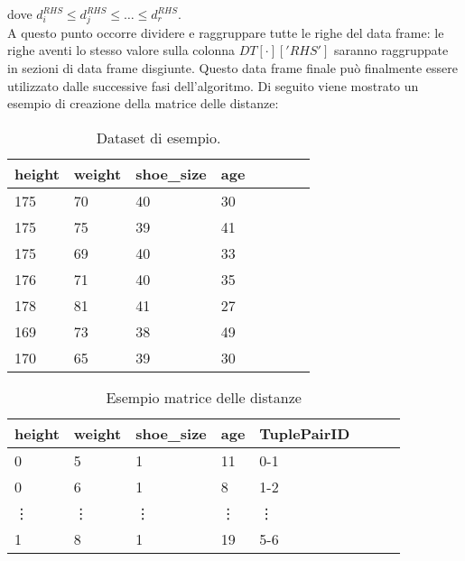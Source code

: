 dove $d^{RHS}_i \leq d^{RHS}_j \leq \ldots \leq d^{RHS}_r$. \\
A questo punto occorre dividere e raggruppare tutte le righe del data frame: le righe aventi lo stesso valore sulla colonna $DT[\cdot]['RHS']$ saranno raggruppate in sezioni di data frame disgiunte. 
Questo data frame finale può finalmente essere utilizzato dalle successive fasi dell'algoritmo.
\newpage
Di seguito viene mostrato un esempio di creazione della matrice delle distanze:\\
\begin{table}[H]
	\centering
	\begin{tabular}{l l l l l l l l}
		height & weight & shoe{\_}size & age \\
		\hline
		175 & 70 & 40 & 30\\
		175 & 75 & 39 & 41\\
		175 & 69 & 40 & 33\\
		176 & 71 & 40 & 35\\
		178 & 81 & 41 & 27\\
		169 & 73 & 38 & 49\\
		170 & 65 & 39 & 30\\
	\end{tabular}
	\caption{Dataset di esempio.}
	\label{tab:Dataset_di_esempio}
\end{table}
\begin{table}[H]
	\centering
	\begin{tabular}{l l l l l l l l}
		height & weight & shoe{\_}size & age & TuplePairID\\
		\hline
		0 & 5 & 1 & 11 & 0-1\\
		0 & 6 & 1 & 8 & 1-2\\
		\vdots & \vdots &  \vdots &  \vdots &  \vdots \\
		1 & 8 & 1 & 19 & 5-6\\
	\end{tabular}
	\caption{Esempio matrice delle distanze}
	\label{tab:Esempio_DM}
\end{table}